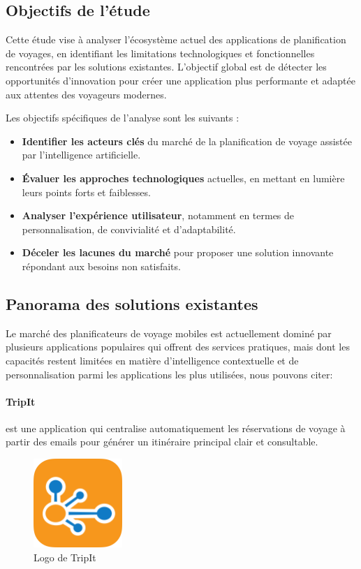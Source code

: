 \subsection{Objectifs de l'étude}

Cette étude vise à analyser l’écosystème actuel des applications de planification de voyages, en identifiant les limitations technologiques et fonctionnelles rencontrées par les solutions existantes. L’objectif global est de détecter les opportunités d’innovation pour créer une application plus performante et adaptée aux attentes des voyageurs modernes.

Les objectifs spécifiques de l’analyse sont les suivants :

\begin{itemize}
    \item \textbf{Identifier les acteurs clés} du marché de la planification de voyage assistée par l’intelligence artificielle.
    \item \textbf{Évaluer les approches technologiques} actuelles, en mettant en lumière leurs points forts et faiblesses.
    \item \textbf{Analyser l’expérience utilisateur}, notamment en termes de personnalisation, de convivialité et d’adaptabilité.
    \item \textbf{Déceler les lacunes du marché} pour proposer une solution innovante répondant aux besoins non satisfaits.
\end{itemize}

\subsection{Panorama des solutions existantes}

Le marché des planificateurs de voyage mobiles est actuellement dominé par plusieurs applications populaires qui offrent des services pratiques, mais dont les capacités restent limitées en matière d’intelligence contextuelle et de personnalisation parmi les applications les plus utilisées, nous pouvons citer: 

\paragraph{TripIt} est une application qui centralise automatiquement les réservations de voyage à partir des emails pour générer un itinéraire principal clair et consultable.

\begin{figure}[H]
\centering
\includegraphics[width=0.3\textwidth]{logos/TripIT.png}
\caption{Logo de TripIt}
\end{figure}

